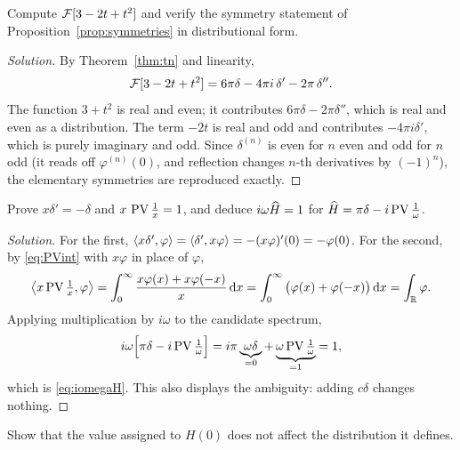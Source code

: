\begin{exercise}\label{ex4}
Compute $\mathcal{F}[3-2t+t^{2}]$ and verify the symmetry statement of
Proposition~\ref{prop:symmetries} in distributional form.
\end{exercise}

\begin{proof}[Solution]
By Theorem~\ref{thm:tn} and linearity,
\begin{equation}
\mathcal{F}[3-2t+t^{2}]=6\pi\delta-4\pi i\,\delta'-2\pi\,\delta'' .
\end{equation}
The function $3+t^{2}$ is real and even; it contributes $6\pi\delta-2\pi\delta''$, which is real and
even as a distribution. The term $-2t$ is real and odd and contributes $-4\pi i\delta'$, which is
purely imaginary and odd. Since $\delta^{(n)}$ is even for $n$ even and odd for $n$ odd
(it reads off $\varphi^{(n)}(0)$, and reflection changes $n$-th derivatives by $(-1)^{n}$), the
elementary symmetries are reproduced exactly.
\end{proof}

\begin{exercise}\label{ex5}
Prove $x\delta'=-\delta$ and $x\,\operatorname{PV}\frac{1}{x}=1$, and deduce $i\omega\widehat{H}=1$ for
$\widehat{H}=\pi\delta-i\operatorname{PV}\frac{1}{\omega}$.
\end{exercise}

\begin{proof}[Solution]
For the first, $\langle x\delta',\varphi\rangle=\langle \delta',x\varphi\rangle=-(x\varphi)'(0)=-\varphi(0)$.
For the second, by \eqref{eq:PVint} with $x\varphi$ in place of $\varphi$,
\begin{equation}
\left\langle x\operatorname{PV}\tfrac{1}{x},\varphi\right\rangle
=\int_{0}^{\infty}\frac{x\varphi(x)+x\varphi(-x)}{x}\,\mathrm{d} x
=\int_{0}^{\infty}\big(\varphi(x)+\varphi(-x)\big)\,\mathrm{d} x=\int_{\mathbb{R}}\varphi .
\end{equation}
Applying multiplication by $i\omega$ to the candidate spectrum,
\begin{equation}
i\omega\Big[\pi\delta-i\operatorname{PV}\tfrac{1}{\omega}\Big]
=i\pi\underbrace{\omega\delta}_{=0}+\underbrace{\omega\operatorname{PV}\tfrac{1}{\omega}}_{=1}=1 ,
\end{equation}
which is \eqref{eq:iomegaH}. This also displays the ambiguity: adding $c\delta$ changes nothing.
\end{proof}

\begin{exercise}\label{ex6}
Show that the value assigned to $H(0)$ does not affect the distribution it defines.
\end{exercise}

